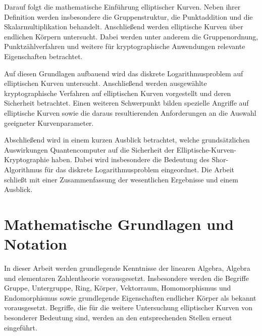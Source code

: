 Darauf folgt die mathematische Einführung elliptischer Kurven. Neben ihrer Definition werden insbesondere die Gruppenstruktur, die Punktaddition und die Skalarmultiplikation behandelt. Anschließend werden elliptische Kurven über endlichen Körpern untersucht. Dabei werden unter anderem die Gruppenordnung,
Punktzählverfahren und weitere für kryptographische Anwendungen
relevante Eigenschaften betrachtet.

Auf diesen Grundlagen aufbauend wird das diskrete Logarithmusproblem auf elliptischen Kurven untersucht. Anschließend werden ausgewählte kryptographische Verfahren auf elliptischen Kurven vorgestellt und deren Sicherheit betrachtet. Einen weiteren Schwerpunkt bilden spezielle Angriffe auf elliptische Kurven sowie die daraus resultierenden Anforderungen an die Auswahl geeigneter Kurvenparameter.

Abschließend wird in einem kurzen Ausblick betrachtet, welche grundsätzlichen Auswirkungen Quantencomputer auf die Sicherheit der Elliptische-Kurven-Kryptographie haben. Dabei wird insbesondere die Bedeutung des Shor-Algorithmus für das diskrete Logarithmusproblem eingeordnet. Die Arbeit schließt mit einer Zusammenfassung der wesentlichen Ergebnisse und einem Ausblick.

\section{Mathematische Grundlagen und Notation}

In dieser Arbeit werden grundlegende Kenntnisse der linearen Algebra,
Algebra und elementaren Zahlentheorie vorausgesetzt. Insbesondere werden
die Begriffe Gruppe, Untergruppe, Ring, Körper, Vektorraum, Homomorphismus
und Endomorphismus sowie grundlegende Eigenschaften endlicher Körper als
bekannt vorausgesetzt. Begriffe, die für die weitere Untersuchung
elliptischer Kurven von besonderer Bedeutung sind, werden an den
entsprechenden Stellen erneut eingeführt.

